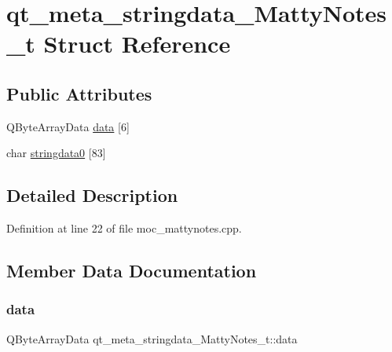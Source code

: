 \hypertarget{structqt__meta__stringdata__MattyNotes__t}{}\section{qt\+\_\+meta\+\_\+stringdata\+\_\+\+Matty\+Notes\+\_\+t Struct Reference}
\label{structqt__meta__stringdata__MattyNotes__t}
\subsection*{Public Attributes}
\begin{DoxyCompactItemize}
\item 
Q\+Byte\+Array\+Data \hyperlink{structqt__meta__stringdata__MattyNotes__t_a9dc2d4f6359a5999afbd08eda36eed8f}{data} \mbox{[}6\mbox{]}
\item 
char \hyperlink{structqt__meta__stringdata__MattyNotes__t_aefec099c932333985b581afe6840c1d4}{stringdata0} \mbox{[}83\mbox{]}
\end{DoxyCompactItemize}


\subsection{Detailed Description}


Definition at line 22 of file moc\+\_\+mattynotes.\+cpp.



\subsection{Member Data Documentation}
\hypertarget{structqt__meta__stringdata__MattyNotes__t_a9dc2d4f6359a5999afbd08eda36eed8f}{}\label{structqt__meta__stringdata__MattyNotes__t_a9dc2d4f6359a5999afbd08eda36eed8f} 
\subsubsection{\texorpdfstring{data}{data}}
{\footnotesize\ttfamily Q\+Byte\+Array\+Data qt\+\_\+meta\+\_\+stringdata\+\_\+\+Matty\+Notes\+\_\+t\+::data}




